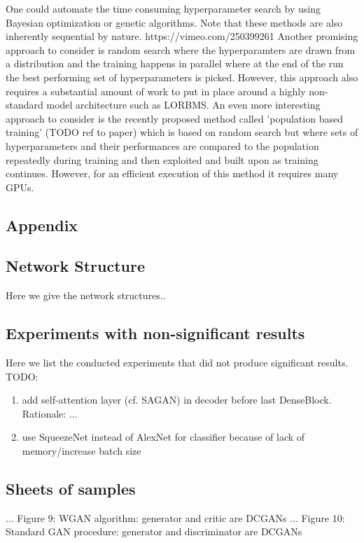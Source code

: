 \documentclass[12pt,a4paper]{article}
\begin{document}
\par One could automate the time consuming hyperparameter search by using Bayesian optimization or genetic algorithms. Note that these methods are also inherently sequential by nature. https://vimeo.com/250399261
Another promising approach to consider is random search where the hyperparamters are drawn from a distribution and the training happens in parallel where at the end of the run the best performing set of hyperparameters is picked. However, this approach also requires a substantial amount of work to put in place around a highly non-standard model architecture such as LORBMS. An even more interesting approach to consider is the recently proposed method called 'population based training' (TODO ref to paper) which is based on random search but where sets of hyperparameters and their performances are compared to the population repeatedly during training and then exploited and built upon as training continues. However, for an efficient execution of this method it requires many GPUs. 

\printbibliography

\begin{appendices}
\section{Appendix}
\subsection{Network Structure}
Here we give the network structures..

\subsection{Experiments with non-significant results}
Here we list the conducted experiments that did not produce significant results. TODO:
\begin{enumerate}
  \item add self-attention layer (cf. SAGAN) in decoder before last DenseBlock. Rationale: ...
  \item use SqueezeNet instead of AlexNet for classifier because of lack of memory/increase batch size
\end{enumerate}

\subsection{Sheets of samples}
...
Figure 9: WGAN algorithm: generator and critic are DCGANs
...
Figure 10: Standard GAN procedure: generator and discriminator are DCGANs
\end{appendices}
\end{document}

